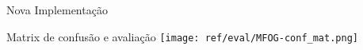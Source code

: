 \documentclass[aspectratio=43,10pt]{beamer}
\begin{document}
\begin{frame}[fragile]{Nova Implementação}
  \begin{alertblock}{Matrix de confusão e avaliação}
    \texttt{[image: ref/eval/MFOG-conf\_mat.png]}
  \end{alertblock}
\end{frame}
\end{document}
